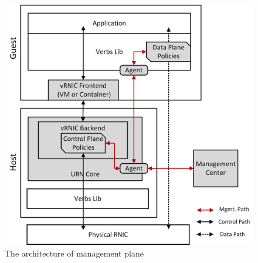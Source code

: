 
\begin{figure}[!ht]
	\centering
	\includegraphics[width=0.75\linewidth]{images/mgmt-center.png}
	\caption{The architecture of \sys management plane}
	\label{fig:mgmt-center}
\end{figure}


